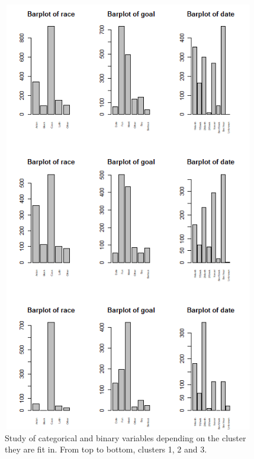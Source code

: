 \begin{figure}
  \centering
  \includegraphics[width= 11cm, height=19cm]{images/profiling/CPG_cluster_race_date.png}
  \caption{Study of categorical and binary variables depending on the cluster they are fit in. From top to bottom, clusters 1, 2 and 3.}
  \label{fig:indiv}
\end{figure}

